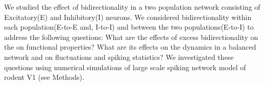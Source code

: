 We studied the effect of bidirectionality in a two population network consisting of Excitatory(E) and Inhibitory(I) neurons. We considered bidirectionality within each population(E-to-E and, I-to-I) and between the two populations(E-to-I) to address the following questions: What are the effects of excess bidirectionality on the on functional properties? What are its effects on the dynamics in a balanced network and on fluctuations and spiking statistics? We investigated these questions using numerical simulations of large scale spiking network  model of rodent V1 (see Methods). \\
